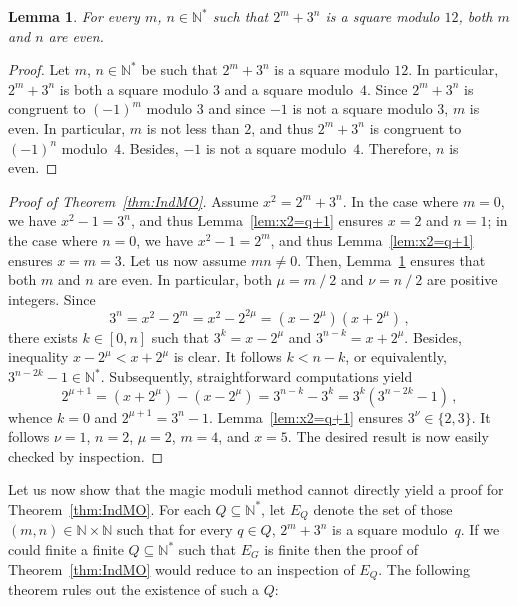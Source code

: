 \documentclass[12pt]{article}
\newcommand{\bZ}{\mathbb{Z}}
\newcommand{\bN}{\mathbb{N}} %
\newcommand{\bNast}{\bN^*}
\newcommand{\binover}{\mathbin{/}}
\newtheorem{lemma}{Lemma}
\theoremstyle{definition}
\begin{document}
   
   \begin{lemma} \label{lem:2m+3n-square-mod-12}
     For every $m$, $n \in \bNast$ such that $2^m + 3^n$ is a square modulo $12$,
     both $m$ and $n$ are even.
   \end{lemma}

   \begin{proof}
     Let $m$, $n \in \bNast$ be such that $2^m + 3^n$ is a square modulo $12$.
     In particular, $2^m + 3^n$ is both a square modulo $3$ and a square modulo~$4$.
     Since $2^m + 3^n$ is congruent to ${(- 1)}^m$ modulo $3$ and since $- 1$ is not a square modulo $3$,
     $m$ is even.
     In particular, $m$ is not less than $2$, and thus $2^m + 3^n$ is congruent to ${(- 1)}^n$ modulo~$4$.
     Besides, $- 1$ is not a square modulo~$4$.
     Therefore, $n$ is even.
   \end{proof}


   
   \begin{proof}[Proof of Theorem~\ref{thm:IndMO}]
     Assume $x^2 = 2^m + 3^n$.
     In the case where $m = 0$,
     we have $x^2 - 1 = 3^n$,
     and thus Lemma~\ref{lem:x2=q+1} ensures $x = 2$ and $n = 1$;
     in the case where $n = 0$,
     we have $x^2 - 1 = 2^m$,
     and thus Lemma~\ref{lem:x2=q+1} ensures $x = m = 3$.
     Let us now assume $mn \ne 0$.
     Then, Lemma~\ref{lem:2m+3n-square-mod-12} ensures that both $m$ and $n$ are even.
     In particular, both $\mu = m \binover 2$ and $\nu = n \binover 2$ are positive integers.
     Since 
     $$
     3^n = x^2 - 2^m = x^2 - 2^{2\mu} = (x - 2^\mu)(x + 2^\mu) \,, 
     $$
     there exists $k \in [0, n]$ such that $3^k = x - 2^\mu$ and $3^{n - k} = x + 2^\mu$.
     Besides, inequality $x - 2^\mu < x + 2^\mu$ is clear. 
     It follows $k < n - k$, or equivalently, $3^{n - 2 k} - 1 \in \bNast$.
     Subsequently, straightforward computations yield
     $$
     2^{\mu + 1} = (x + 2^\mu) - (x - 2^\mu) = 3^{n - k} - 3^k = 3^k \left( 3^{n - 2k} - 1 \right) \,,
     $$
     whence $k = 0$ and $2^{\mu + 1} = 3^n - 1$.
     Lemma~\ref{lem:x2=q+1} ensures $3^\nu \in \{ 2, 3 \}$.
     It follows $\nu = 1$, $n = 2$, $\mu = 2$, $m = 4$, and $x = 5$.
     The desired result is now easily checked by inspection. 
  \end{proof}

  Let us now show that 
  the magic moduli method cannot directly yield a proof for Theorem~\ref{thm:IndMO}.
  For each $Q \subseteq \bNast$,
  let $E_Q$ denote the set of those $(m, n) \in \bN \times \bN$ such that for every $q \in Q$,
  $2^m + 3^n$ is a square modulo~$q$.
  If we could finite a finite $Q \subseteq \bNast$ such that $E_G$ is finite
  then the proof of Theorem~\ref{thm:IndMO} would reduce to an inspection of $E_Q$.
  The following theorem rules out the existence of such a $Q$:
\end{document}
